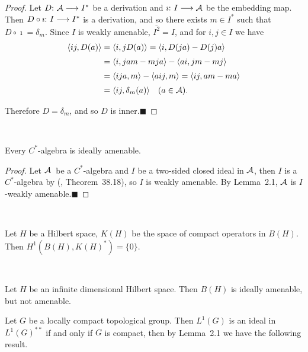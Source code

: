 \documentclass[fleqn]{mat01}
\begin{document}
\begin{proof}
Let $D\hbox{:}\ {\cal A} \longrightarrow I^*$ be a derivation and
$\imath\hbox{:}\ I \longrightarrow {\cal A} $ be the embedding map. Then
$D\circ \imath\hbox{:}\ I \longrightarrow I^*$ is a derivation, and so
there exists $ m \in I^*$ such that $ D \circ \imath = \delta_m $. Since
$I$ is weakly amenable, $\overline{I^2}=I$, and for $i,j \in I$ we have
\begin{align*}
\langle ij, D(a)\rangle &= \langle i, jD(a)\rangle = \langle i,
D(ja)-D(j)a \rangle \\[.2pc]
&= \langle i, jam - mja \rangle -\langle ai, jm -mj \rangle \\[.2pc]
&= \langle ija, m \rangle - \langle aij, m \rangle = \langle ij, am -
ma \rangle \\[.2pc]
&= \langle ij, \delta_{m} (a) \rangle\quad (a \in {\cal A)}.
\end{align*}

Therefore $D=\delta_m$, and so $D$ is inner.\hfill $\blacksquare$
\end{proof}

\begin{coro}$\left.\right.$\vspace{.5pc}

\noindent Every $C^*$-algebra is ideally amenable.
\end{coro}

\begin{proof}
Let ${\cal A}$\ be a $C^*$-algebra and $I$ be a two-sided closed ideal in
${\cal A}$, then $I$ is a $C^*$-algebra by (\cite{B-D}, Theorem~38.18),
so $I$ is weakly amenable. By Lemma~2.1, ${\cal A}$ is $I$-weakly
amenable.\hfill $\blacksquare$
\end{proof}

\begin{coro}$\left.\right.$\vspace{.5pc}

\noindent Let $H$ be a Hilbert space{\rm ,} $K(H)$ be the space of
compact operators in $B(H)$. Then $H^1(B(H),K(H)^*)=\{0\}$.
\end{coro}

\begin{coro}$\left.\right.$\vspace{.5pc}

\noindent Let $H$ be an infinite dimensional Hilbert space. Then $B(H)$
is ideally amenable{\rm ,} but not amenable.
\end{coro}

Let $G$ be a locally compact topological group. Then $L^1(G)$ is an
ideal in $L^1(G)^{**}$ if and only if $G$ is compact, then by Lemma~2.1
we have the following result.
\end{document}
